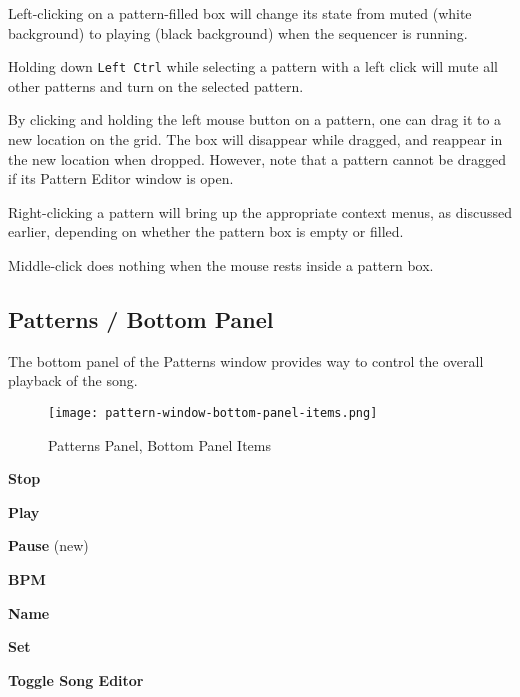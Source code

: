    Left-clicking on a pattern-filled box will change its state
   from muted (white background) to playing (black background) when
   the sequencer is running.

   Holding down \texttt{Left Ctrl} while selecting a pattern
   with a left click will mute all other patterns and turn on the selected
   pattern.

   By clicking and holding the left mouse button on a pattern,
   one can drag it to a new location on the grid.  The box
   will disappear while dragged, and reappear in the new location when
   dropped.  However, note that a pattern cannot be dragged if its
   Pattern Editor window is open.

   Right-clicking a pattern will bring up the appropriate context menus, as
   discussed earlier, depending on whether the pattern box is empty or
   filled.

   Middle-click does nothing when the mouse rests inside a pattern box.

\subsection{Patterns / Bottom Panel}
\label{subsec:seq64_patterns_panel_bottom}

   The bottom panel of the Patterns window provides way to control the
   overall playback of the song.

\begin{figure}[H]
   \centering 
   \texttt{[image: pattern-window-bottom-panel-items.png]}
   \caption{Patterns Panel, Bottom Panel Items}
   \label{fig:pattern_window_bottom_panel_items}
\end{figure}

   \begin{enumber}
      \item \textbf{Stop}
      \item \textbf{Play}
      \item \textbf{Pause} (new)
      \item \textbf{BPM}
      \item \textbf{Name}
      \item \textbf{Set}
      \item \textbf{Toggle Song Editor}
   \end{enumber}

